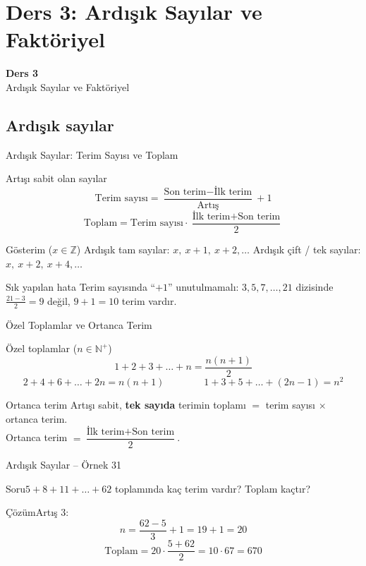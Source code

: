 \documentclass[aspectratio=169,11pt]{beamer}
\newcommand{\soru}[3]{%
\begin{frame}{#1}
  \begin{block}{Soru}\large #2\end{block}
  \pause
  \begin{exampleblock}{Çözüm}\large #3\end{exampleblock}
\end{frame}}
\begin{document}
\section{Ders 3: Ardışık Sayılar ve Faktöriyel}
\begin{frame}
\centering\Large\color{anamavi}\textbf{Ders 3}\\[6pt]\normalsize Ardışık Sayılar ve Faktöriyel
\end{frame}

\subsection{Ardışık sayılar}
\begin{frame}{Ardışık Sayılar: Terim Sayısı ve Toplam}
\begin{block}{Artışı sabit olan sayılar}
\[\text{Terim sayısı}=\frac{\text{Son terim}-\text{İlk terim}}{\text{Artış}}+1\]
\[\text{Toplam}=\text{Terim sayısı}\cdot\frac{\text{İlk terim}+\text{Son terim}}{2}\]
\end{block}
\begin{block}{Gösterim (\(x\in\mathbb{Z}\))}
Ardışık tam sayılar: \(x,\ x+1,\ x+2,\dots\) \qquad Ardışık çift / tek sayılar: \(x,\ x+2,\ x+4,\dots\)
\end{block}
\begin{alertblock}{Sık yapılan hata}
Terim sayısında ``\(+1\)'' unutulmamalı: \(3,5,7,\dots,21\) dizisinde \(\frac{21-3}{2}=9\) değil, \(9+1=10\) terim vardır.
\end{alertblock}
\end{frame}

\begin{frame}{Özel Toplamlar ve Ortanca Terim}
\begin{block}{Özel toplamlar (\(n\in\mathbb{N}^{+}\))}
\[1+2+3+\dots+n=\frac{n(n+1)}{2}\]
\[2+4+6+\dots+2n=n(n+1)\qquad\qquad 1+3+5+\dots+(2n-1)=n^2\]
\end{block}
\begin{block}{Ortanca terim}
Artışı sabit, \textbf{tek sayıda} terimin toplamı \(=\) terim sayısı \(\times\) ortanca terim.\\
Ortanca terim \(=\dfrac{\text{İlk terim}+\text{Son terim}}{2}\).
\end{block}
\end{frame}

\soru{Ardışık Sayılar -- Örnek 31}
{\(5+8+11+\dots+62\) toplamında kaç terim vardır? Toplam kaçtır?}
{Artış \(3\):
\[n=\frac{62-5}{3}+1=19+1=20\]
\[\text{Toplam}=20\cdot\frac{5+62}{2}=10\cdot 67=670\]}
\end{document}
